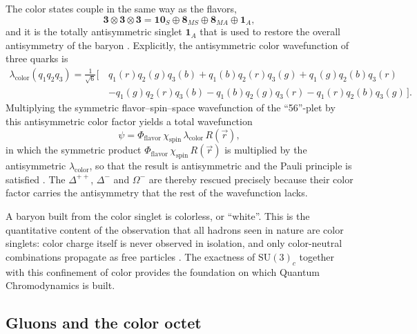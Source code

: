 The color states couple in the same way as the flavors,
\begin{equation}
    \mathbf{3} \otimes \mathbf{3} \otimes \mathbf{3}
    = \mathbf{10}_{S} \oplus \mathbf{8}_{MS} \oplus \mathbf{8}_{MA}
      \oplus \mathbf{1}_{A},
\end{equation}
and it is the totally antisymmetric singlet $\mathbf{1}_{A}$ that is used to restore
the overall antisymmetry of the baryon \cite[Ch.~10]{Amsler2018}. Explicitly, the
antisymmetric color wavefunction of three quarks is
\begin{equation}
\begin{split}
    \lambda_{\text{color}}(q_1 q_2 q_3) = \frac{1}{\sqrt{6}}
    \big[\, & q_1(r)q_2(g)q_3(b) + q_1(b)q_2(r)q_3(g) + q_1(g)q_2(b)q_3(r) \\
    & - q_1(g)q_2(r)q_3(b) - q_1(b)q_2(g)q_3(r) - q_1(r)q_2(b)q_3(g) \,\big].
\end{split}
\end{equation}
Multiplying the symmetric flavor--spin--space wavefunction of the ``56''-plet by this
antisymmetric color factor yields a total wavefunction
\begin{equation}
    \psi = \Phi_{\text{flavor}}\,\chi_{\text{spin}}\,\lambda_{\text{color}}\,R(\vec{r}),
    \label{eq:full-Psi-color}
\end{equation}
in which the symmetric product $\Phi_{\text{flavor}}\,\chi_{\text{spin}}\,R(\vec{r})$
is multiplied by the antisymmetric $\lambda_{\text{color}}$, so that the result is
antisymmetric and the Pauli principle is satisfied \cite[Ch.~10]{Amsler2018}. The
$\Delta^{++}$, $\Delta^-$ and $\Omega^-$ are thereby rescued precisely because their
color factor carries the antisymmetry that the rest of the wavefunction lacks.

A baryon built from the color singlet is colorless, or ``white''. This is the
quantitative content of the observation that all hadrons seen in nature are color
singlets: color charge itself is never observed in isolation, and only color-neutral
combinations propagate as free particles \cite[Ch.~10]{Amsler2018}. The exactness of
$\mathrm{SU}(3)_{c}$ together with this confinement of color provides the foundation on which Quantum Chromodynamics is built.

\FloatBarrier

\subsection{Gluons and the color octet}
\label{subsec:gluons-octet}

